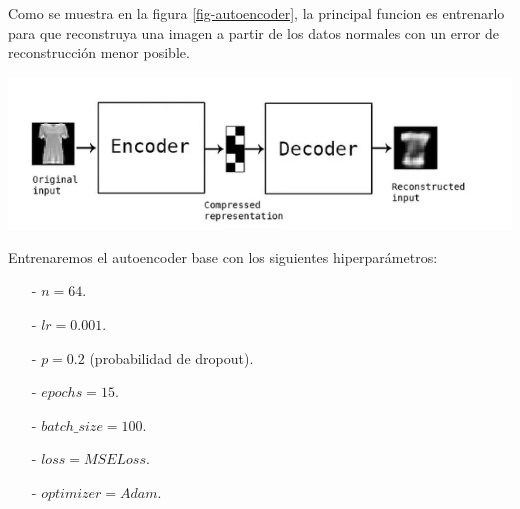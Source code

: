 \documentclass[aps,prl,reprint,groupedaddress]{revtex4-2}
\newenvironment{Figura}
  {\par\medskip\noindent\minipage{\linewidth}}
  {\endminipage\par\medskip}
\begin{document}
Como se muestra en la figura \ref{fig-autoencoder}, la principal funcion es 
entrenarlo para que reconstruya una imagen a partir de los datos normales con 
un error de reconstrucción menor posible. 

\begin{Figura}
  \centering
  \includegraphics[width=1\textwidth]{figs/ejem_encoder_decoder.png}
  \label{fig-autoencoder}
\end{Figura}

Entrenaremos el autoencoder base con los siguientes hiperparámetros:
\begin{itemize}
  \item [-] $n = 64$.
  \item [-] $lr = 0.001$.
  \item [-] $p = 0.2$ (probabilidad de dropout).
  \item [-] $epochs = 15$.
  \item [-] $batch\_size = 100$.
  \item [-] $loss = MSELoss$.
  \item [-] $optimizer = Adam$.
\end{itemize}
\end{document}
